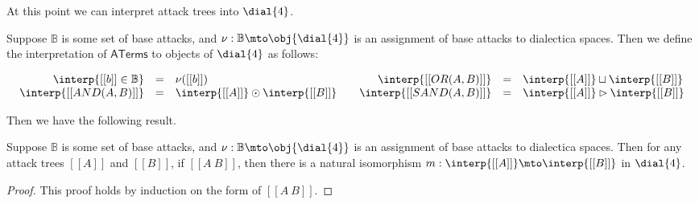 At this point we can interpret attack trees into $\dial{4}$.
\begin{definition}
  \label{def:interp-aterms-ternary}
  Suppose $\mathbb{B}$ is some set of base attacks, and $\nu :
  \mathbb{B} \mto \obj{\dial{4}}$ is an assignment of base attacks to
  dialectica spaces.  Then we define the interpretation of
  $\mathsf{ATerms}$ to objects of $\dial{4}$ as follows:
  \begin{center}
    \begin{math}
      \setlength{\arraycolsep}{5px}
      \begin{array}{lll}
        \begin{array}{rll}
          \interp{[[b]] \in \mathbb{B}} & = & \nu([[b]])\\
        \interp{[[AND(A,B)]]} & = & \interp{[[A]]} \odot \interp{[[B]]}\\
        \end{array}
        &
        \begin{array}{rll}
          \interp{[[OR(A,B)]]} & = & \interp{[[A]]} \sqcup \interp{[[B]]}\\
          \interp{[[SAND(A,B)]]} & = & \interp{[[A]]} \rhd \interp{[[B]]}\\          
        \end{array}
      \end{array}
    \end{math}
  \end{center}
\end{definition}
Then we have the following result.
\begin{lemma}
  \label{lemma:equivalence_of_attack_trees_lineale}
  Suppose $\mathbb{B}$ is some set of base attacks, and $\nu :
  \mathbb{B} \mto \obj{\dial{4}}$ is an assignment of base attacks to
  dialectica spaces.  Then for any attack trees $[[A]]$ and $[[B]]$,
  if $[[A ~ B]]$, then there is a natural isomorphism $m :
  \interp{[[A]]} \mto \interp{[[B]]}$ in $\dial{4}$.
\end{lemma}
\begin{proof}
  This proof holds by induction on the form of $[[A ~ B]]$.
\end{proof}

